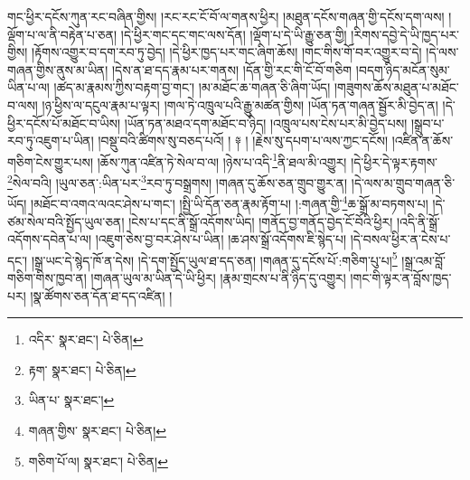 གང་ཕྱིར་དངོས་ཀུན་རང་བཞིན་གྱིས། །རང་རང་ངོ་བོ་ལ་གནས་ཕྱིར། །མཐུན་དངོས་གཞན་གྱི་དངོས་དག་ལས། །ལྡོག་པ་ལ་ནི་བརྟེན་པ་ཅན། །དེ་ཕྱིར་གང་དང་གང་ལས་དོན། །ལྡོག་པ་དེ་ཡི་རྒྱུ་ཅན་གྱི། །རིགས་དབྱེ་དེ་ཡི་ཁྱད་པར་གྱིས། །རྟོགས་འགྱུར་བ་དག་རབ་ཏུ་བྱེད། །དེ་ཕྱིར་ཁྱད་པར་གང་ཞིག་ཆོས། །གང་གིས་གོ་བར་འགྱུར་བ་དེ། །དེ་ལས་གཞན་གྱིས་ནུས་མ་ཡིན། །དེས་ན་ཐ་དད་རྣམ་པར་གནས། །དོན་གྱི་རང་གི་ངོ་བོ་གཅིག །བདག་ཉིད་མངོན་སུམ་ཡིན་པ་ལ། །ཚད་མ་རྣམས་ཀྱིས་བརྟག་བྱ་གང་། །མ་མཐོང་ཆ་གཞན་ཅི་ཞིག་ཡོད། །གཟུགས་ཆོས་མཐུན་པ་མཐོང་བ་ལས། །ཉ་ཕྱིས་ལ་དངུལ་རྣམ་པ་ལྟར། །གལ་ཏེ་འཁྲུལ་པའི་རྒྱུ་མཚན་གྱིས། །ཡོན་ཏན་གཞན་སྦྱོར་མི་བྱེད་ན། །དེ་ཕྱིར་དངོས་པོ་མཐོང་བ་ཡིས། །ཡོན་ཏན་མཐའ་དག་མཐོང་བ་ཉིད། །འཁྲུལ་པས་ངེས་པར་མི་བྱེད་པས། །སྒྲུབ་པ་རབ་ཏུ་འཇུག་པ་ཡིན། །བསྡུ་བའི་ཚིགས་སུ་བཅད་པའོ། ། ༈ ། །རྗེས་སུ་དཔག་པ་ལས་ཀྱང་དངོས། །འཛིན་ན་ཆོས་གཅིག་ངེས་གྱུར་པས། །ཆོས་ཀུན་འཛིན་ཏེ་སེལ་བ་ལ། །ཉེས་པ་འདི་\footnote{འདིར་  སྣར་ཐང་།  པེ་ཅིན། }ནི་ཐལ་མི་འགྱུར། །དེ་ཕྱིར་དེ་ལྟར་རྟགས་\footnote{རྟག་  སྣར་ཐང་།  པེ་ཅིན། }སེལ་བའི། །ཡུལ་ཅན་:ཡིན་པར་\footnote{ཡིན་པ་  སྣར་ཐང་། }རབ་ཏུ་བསྒྲགས། །གཞན་དུ་ཆོས་ཅན་གྲུབ་གྱུར་ན། །དེ་ལས་མ་གྲུབ་གཞན་ཅི་ཡོད། །མཐོང་བ་འགའ་ལའང་ཤེས་པ་གང་། །སྤྱི་ཡི་དོན་ཅན་རྣམ་རྟོག་པ། །:གཞན་གྱི་\footnote{གཞན་གྱིས་  སྣར་ཐང་།  པེ་ཅིན། }ཆ་སྒྲོ་མ་བཏགས་པ། །དེ་ཙམ་སེལ་བའི་སྤྱོད་ཡུལ་ཅན། །ངེས་པ་དང་ནི་སྒྲོ་འདོགས་ཡིད། །གནོད་བྱ་གནོད་བྱེད་ངོ་བོའི་ཕྱིར། །འདི་ནི་སྒྲོ་འདོགས་དབེན་པ་ལ། །འཇུག་ཅེས་བྱ་བར་ཤེས་པ་ཡིན། །ཆ་ཤས་སྒྲོ་འདོགས་ཇི་སྙེད་པ། །དེ་བསལ་ཕྱིར་ན་ངེས་པ་དང་། །སྒྲ་ཡང་དེ་སྙེད་ཁོ་ན་དེས། །དེ་དག་སྤྱོད་ཡུལ་ཐ་དད་ཅན། །གཞན་དུ་དངོས་པོ་:གཅིག་པུ་པ།\footnote{གཅིག་པོ་ལ།  སྣར་ཐང་།  པེ་ཅིན། } །སྒྲ་འམ་བློ་གཅིག་གིས་ཁྱབ་ན། །གཞན་ཡུལ་མ་ཡིན་དེ་ཡི་ཕྱིར། །རྣམ་གྲངས་པ་ནི་ཉིད་དུ་འགྱུར། །གང་གི་ལྟར་ན་བློས་ཁྱད་པར། །སྣ་ཚོགས་ཅན་དོན་ཐ་དད་འཛིན། །
